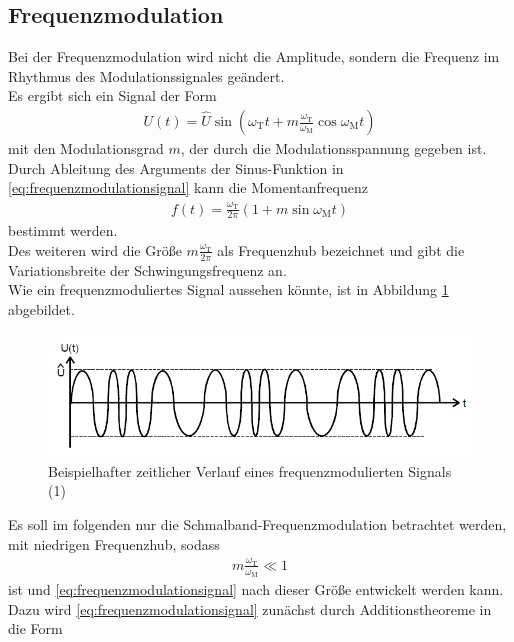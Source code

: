 \documentclass[]{scrartcl}
\begin{document}
\subsection{Frequenzmodulation}\label{sec:frequenzmodulation}
Bei der Frequenzmodulation wird nicht die Amplitude, sondern die Frequenz im Rhythmus des Modulationssignales geändert.\\
Es ergibt sich ein Signal der Form
\begin{align}
U\left(t\right)=\hat{U}\sin \left( \omega_{\text{T}}t+ m \frac{\omega_{\text{T}}}{\omega_{\text{M}}}\cos \omega_{\text{M}}t \right)\label{eq:frequenzmodulationsignal}
\end{align}
mit den Modulationsgrad $m$, der durch die Modulationsspannung gegeben ist.\\
Durch Ableitung des Arguments der Sinus-Funktion in \ref{eq:frequenzmodulationsignal} kann die Momentanfrequenz
\begin{align}
f\left(t\right)=\frac{\omega_{\text{T}}}{2\pi}\left(1+m\sin \omega_{\text{M}}t\right)
\end{align} 
bestimmt werden.\\
Des weiteren wird die Größe $m\frac{\omega_{\text{T}}}{2\pi}$ als Frequenzhub bezeichnet und gibt die Variationsbreite der Schwingungsfrequenz an.\\
Wie ein frequenzmoduliertes Signal aussehen könnte, ist in Abbildung
\ref{fig:frequenzmodulation_beispiel} abgebildet.
\begin{figure}[H]
\centering 
\includegraphics[width=13cm]{images/frequenzmodulation_bsp.png}
\caption{Beispielhafter zeitlicher Verlauf eines frequenzmodulierten Signals (1)}
\label{fig:frequenzmodulation_beispiel}
\end{figure} 
Es soll im folgenden nur die Schmalband-Frequenzmodulation betrachtet werden, mit niedrigen Frequenzhub, sodass
\begin{align}
m\frac{\omega_{\text{T}}}{\omega_{\text{M}}}\ll 1 \label{eq:frequenzmodulationsignalentwicklungsparameter}
\end{align}
ist und \ref{eq:frequenzmodulationsignal} nach dieser Größe entwickelt werden kann. Dazu wird \ref{eq:frequenzmodulationsignal} zunächst durch Additionstheoreme in die Form
\end{document}
